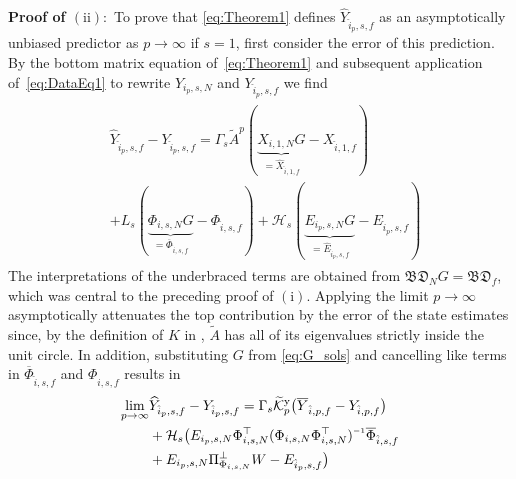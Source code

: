 \noindent\textbf{Proof of $\mathrm{(ii)}:$} To prove that \eqref{eq:Theorem1} defines $\widehat{Y}_{\hat{i}_p,s,f}$ as an asymptotically unbiased predictor as $p\rightarrow\infty$ if $s=1$, first consider the error of this prediction. By the bottom matrix equation of~\eqref{eq:Theorem1} and subsequent application of~\eqref{eq:DataEq1} to rewrite $Y_{i_p,s,N}$ and $Y_{\hat{i}_p,s,f}$ we find
\begin{align}\label{eq:Yf_error1}
    \begin{split}
        &\!\!\!\widehat{Y}_{\hat{i}_p,s,f}-Y_{\hat{i}_p,s,f} = \Gamma_s \tilde{A}^p (\underbrace{X_{i,1,N}G}_{=\widehat{X}_{\hat{i},1,f}}-X_{\hat{i},1,f}) \\
        &+L_s(\underbrace{\Phi_{i,s,N}G}_{=\overline{\Phi}_{\hat{i},s,f}}-\Phi_{\hat{i},s,f}) +\mathcal{H}_s (\underbrace{E_{i_p,s,N}G}_{=\widehat{E}_{\hat{i}_p,s,f}}-E_{\hat{i}_p,s,f})
    \end{split}
\end{align}
The interpretations of the underbraced terms are obtained from $\mathfrak{BD}_N G=\mathfrak{BD}_f$, which was central to the preceding proof of $\mathrm{(i)}$. Applying the limit $p\rightarrow\infty$ asymptotically attenuates the top contribution by the error of the state estimates since, by the definition of $K$ in , $\tilde{A}$ has all of its eigenvalues strictly inside the unit circle. In addition, substituting $G$ from \eqref{eq:G_sols} and cancelling like terms in $\overline{\Phi}_{\hat{i},s,f}$ and $\Phi_{\hat{i},s,f}$ results in
\begin{align}
\begin{split}
        \lim_{p\rightarrow\infty} &\widehat{Y}_{\hat{i}_p,s,f}-Y_{\hat{i}_p,s,f} = \Gamma_s\tKp{y}\big(\overline{Y}_{\hat{i},p,f}-Y_{\hat{i},p,f}\big)\\
        &+\mathcal{H}_s\big(E_{i_p,s,N}\Phi_{i,s,N}^\top(\Phi_{i,s,N}\Phi_{i,s,N}^\top)\inv\overline{\Phi}_{\hat{i},s,f}\\
        &+E_{i_p,s,N}\Pi_{\Phi_{i,s,N}}^\bot W-E_{\hat{i}_p,s,f}\big)
\end{split}
\end{align}

